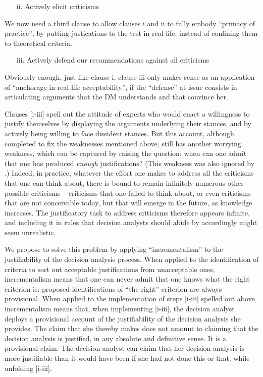 \documentclass[preprint, french, english, 11pt, authoryear]{elsarticle}%
\begin{document}
\begin{itemize}
\item[ii.]	Actively elicit criticisms
\end{itemize}

We now need a third clause to allow clauses i and ii to fully embody “primacy of practice”, by putting justications to the test in real-life, instead of confining them to theoretical criteria.

\begin{itemize}
\item[iii.]	 Actively defend our recommendations against all criticisms
\end{itemize}

 Obviously enough, just like clause i, clause iii only makes sense as an application of ``anchorage in real-life acceptability'', if the ``defense'' at issue consists in articulating arguments that the \ac{DM} understands and that convince her.

Clauses [i-iii] spell out the attitude of experts who would enact a willingness to justify themselves by displaying the arguments underlying their stances, and by actively being willing to face dissident stances. But this account, although completed to fix the weaknesses mentioned above, still has another worrying weakness, which can be captured by raising the question: when can one admit that one has produced \emph{enough} justifications? (This weakness was also ignored by  \citet{meinard_what_2017}.) Indeed, in practice, whatever the effort one makes to address all the criticisms that one can think about, there is bound to remain infinitely numerous other possible criticisms -- criticisms that one failed to think about, or even criticisms that are not conceivable today, but that will emerge in the future, as knowledge increases. The justificatory task to address criticisms therefore appears infinite, and including it in rules that decision analysts should abide by accordingly might seem unrealistic.

We propose to solve this problem by applying ``incrementalism'' to the justifiability of the decision analysis process. When applied to the identification of criteria to sort out acceptable justifications from unacceptable ones, incrementalism means that one can never admit that one knows what the right criterion is: proposed identifications of ``the right'' criterion are always provisional. When applied to the implementation of steps [i-iii] spelled out above, incrementalism means that, when implementing [i-iii], the decision analyst deploys a provisional account of the justifiability of the decision analysis she provides. The claim that she thereby makes does not amount to claiming that the decision analysis is justified, in any absolute and definitive sense. It is a provisional claim. The decision analyst can claim that her decision analysis is more justifiable than it would have been if she had not done this or that, while unfolding [i-iii].
\end{document}
